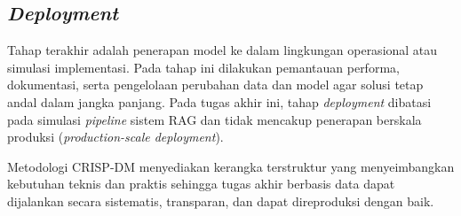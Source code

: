 \subsection{\textit{Deployment}}
Tahap terakhir adalah penerapan model ke dalam lingkungan operasional atau simulasi implementasi. Pada tahap ini dilakukan pemantauan performa, dokumentasi, serta pengelolaan perubahan data dan model agar solusi tetap andal dalam jangka panjang. Pada tugas akhir ini, tahap \textit{deployment} dibatasi pada simulasi \textit{pipeline} sistem RAG dan tidak mencakup penerapan berskala produksi (\textit{production-scale deployment}).

Metodologi CRISP-DM menyediakan kerangka terstruktur yang menyeimbangkan kebutuhan teknis dan praktis sehingga tugas akhir berbasis data dapat dijalankan secara sistematis, transparan, dan dapat direproduksi dengan baik.
